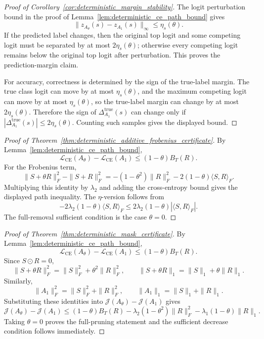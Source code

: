 \documentclass[11pt]{article}
\theoremstyle{plain}
\theoremstyle{definition}
\theoremstyle{remark}
\newcommand{\1}{\mathbf{1}}
\begin{document}
\begin{proof}[Proof of Corollary~\ref{cor:deterministic_margin_stability}]
The logit perturbation bound in the proof of Lemma~\ref{lem:deterministic_ce_path_bound} gives
\[
\|z_{A_\theta}(s)-z_{A_1}(s)\|_\infty\le\eta_s(\theta).
\]
If the predicted label changes, then the original top logit and some competing logit must be separated by at most \(2\eta_s(\theta)\); otherwise every competing logit remains below the original top logit after perturbation. This proves the prediction-margin claim.

For accuracy, correctness is determined by the sign of the true-label margin. The true class logit can move by at most \(\eta_s(\theta)\), and the maximum competing logit can move by at most \(\eta_s(\theta)\), so the true-label margin can change by at most \(2\eta_s(\theta)\). Therefore the sign of \(\Delta_{A_1}^{\mathrm{true}}(s)\) can change only if \(|\Delta_{A_1}^{\mathrm{true}}(s)|\le2\eta_s(\theta)\). Counting such samples gives the displayed bound.
\end{proof}

\begin{proof}[Proof of Theorem~\ref{thm:deterministic_additive_frobenius_certificate}]
By Lemma~\ref{lem:deterministic_ce_path_bound},
\[
\mathcal L_{\mathrm{CE}}(A_\theta)-\mathcal L_{\mathrm{CE}}(A_1)
\le
(1-\theta)B_T(R).
\]
For the Frobenius term,
\[
\|S+\theta R\|_F^2-\|S+R\|_F^2
=
-(1-\theta^2)\|R\|_F^2
-2(1-\theta)\langle S,R\rangle_F.
\]
Multiplying this identity by \(\lambda_2\) and adding the cross-entropy bound gives the displayed path inequality. The \(\eta\)-version follows from
\[
-2\lambda_2(1-\theta)\langle S,R\rangle_F
\le
2\lambda_2(1-\theta)|\langle S,R\rangle_F|.
\]
The full-removal sufficient condition is the case \(\theta=0\).
\end{proof}

\begin{proof}[Proof of Theorem~\ref{thm:deterministic_mask_certificate}]
By Lemma~\ref{lem:deterministic_ce_path_bound},
\[
\mathcal L_{\mathrm{CE}}(A_\theta)-\mathcal L_{\mathrm{CE}}(A_1)
\le
(1-\theta)B_T(R).
\]
Since \(S\odot R=0\),
\[
\|S+\theta R\|_F^2=\|S\|_F^2+\theta^2\|R\|_F^2,
\qquad
\|S+\theta R\|_1=\|S\|_1+\theta\|R\|_1.
\]
Similarly,
\[
\|A_1\|_F^2=\|S\|_F^2+\|R\|_F^2,
\qquad
\|A_1\|_1=\|S\|_1+\|R\|_1.
\]
Substituting these identities into \(\mathcal J(A_\theta)-\mathcal J(A_1)\) gives
\[
\mathcal J(A_\theta)-\mathcal J(A_1)
\le
(1-\theta)B_T(R)
-\lambda_2(1-\theta^2)\|R\|_F^2
-\lambda_1(1-\theta)\|R\|_1.
\]
Taking \(\theta=0\) proves the full-pruning statement and the sufficient decrease condition follows immediately.
\end{proof}
\end{document}
